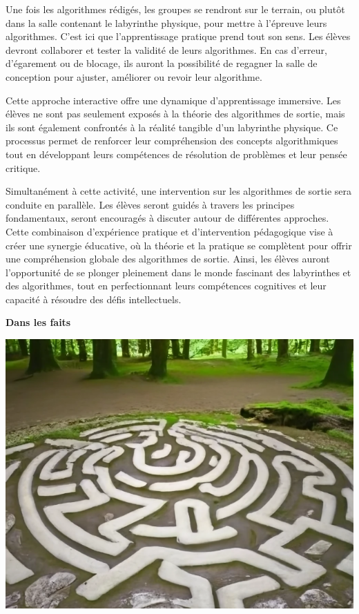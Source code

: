 Une fois les algorithmes rédigés, les groupes se rendront sur le terrain, ou plutôt dans la salle contenant le labyrinthe physique,
pour mettre à l'épreuve leurs algorithmes. C'est ici que l'apprentissage pratique prend tout son sens. Les élèves devront collaborer
et tester la validité de leurs algorithmes. En cas d'erreur, d'égarement ou de blocage, ils auront la possibilité de regagner la salle
de conception pour ajuster, améliorer ou revoir leur algorithme.

Cette approche interactive offre une dynamique d'apprentissage immersive. Les élèves ne sont pas seulement exposés à la théorie des
algorithmes de sortie, mais ils sont également confrontés à la réalité tangible d'un labyrinthe physique. Ce processus permet de renforcer
leur compréhension des concepts algorithmiques tout en développant leurs compétences de résolution de problèmes et leur pensée critique.

Simultanément à cette activité, une intervention sur les algorithmes de sortie sera conduite en parallèle.
Les élèves seront guidés à travers les principes fondamentaux, seront encouragés à discuter autour de différentes approches.
Cette combinaison d'expérience pratique et d'intervention pédagogique vise à créer une synergie éducative, où la théorie et la pratique
se complètent pour offrir une compréhension globale des algorithmes de sortie. Ainsi, les élèves auront l'opportunité de se plonger
pleinement dans le monde fascinant des labyrinthes et des algorithmes, tout en perfectionnant leurs compétences cognitives
et leur capacité à résoudre des défis intellectuels.

\textbf{Dans les faits}

\smallskip
\includegraphics[scale=0.2]{./images/visuelAct1.png}

